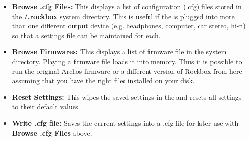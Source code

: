 \begin{itemize}
    \begin{itemize}
    \item \textbf{Browse .cfg Files: }
      This displays a list of configuration (.cfg) files stored in the \textbf{/.rockbox} system directory.  This is useful if the \dap is plugged into more than one different output device (e.g. headphones, computer, car stereo, hi{}-fi) so that a settings file can be maintained for each.
    \item \textbf{Browse Firmwares:} 
      This displays a list of firmware file in the  system directory. Playing a firmware file loads it into memory.  Thus it is possible to run the original Archos firmware or a different version of Rockbox from here assuming that you have the right files installed on your disk.
    \item \textbf{Reset Settings: }
      This wipes the saved settings in the \dap and resets all settings to their default values.
    \item \textbf{Write .cfg file: }
      Saves the current settings into a .cfg file for later use with \textbf{Browse .cfg Files} above.
    \end{itemize}
    
  \end{itemize}

